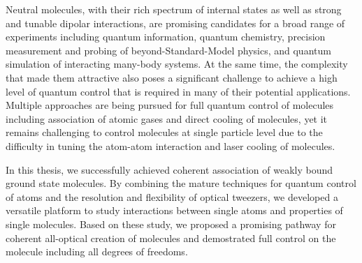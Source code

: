 
Neutral molecules, with their rich spectrum of internal states as well as
strong and tunable dipolar interactions, are promising candidates for
a broad range of experiments including quantum information,
quantum chemistry, precision measurement and probing of beyond-Standard-Model physics,
and quantum simulation of interacting many-body systems.
At the same time, the complexity that made them attractive also poses a significant challenge
to achieve a high level of quantum control that is required in many of
their potential applications.
Multiple approaches are being pursued for full quantum control of molecules
including association of atomic gases and direct cooling of molecules,
yet it remains challenging to control molecules at single particle level
due to the difficulty in tuning the atom-atom interaction
and laser cooling of molecules.

In this thesis, we successfully achieved coherent association of
weakly bound ground state molecules.
By combining the mature techniques for quantum control of atoms
and the resolution and flexibility of optical tweezers,
we developed a versatile platform to study interactions between single atoms
and properties of single molecules.
Based on these study, we proposed a promising pathway
for coherent all-optical creation of molecules
and demostrated full control on the molecule including all degrees of freedoms.
